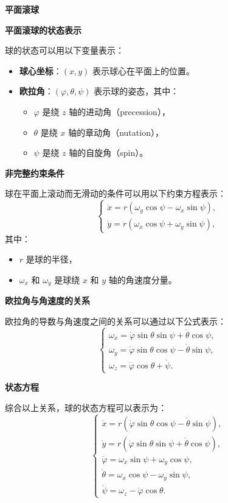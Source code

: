 \documentclass[12pt, a4paper, oneside, UTF8]{ctexbook}  %
\begin{document}
\begin{example}\label{pingmiangunqiu}
    \textbf{平面滚球}

\textbf{平面滚球的状态表示}

球的状态可以用以下变量表示：
\begin{itemize}
    \item \textbf{球心坐标}：$(x, y)$ 表示球心在平面上的位置。
    \item \textbf{欧拉角}：$(\varphi, \theta, \psi)$ 表示球的姿态，其中：
    \begin{itemize}
        \item $\varphi$ 是绕 $z$ 轴的进动角（precession），
        \item $\theta$ 是绕 $x$ 轴的章动角（nutation），
        \item $\psi$ 是绕 $z$ 轴的自旋角（spin）。
    \end{itemize}
\end{itemize}

\textbf{非完整约束条件}

球在平面上滚动而无滑动的条件可以用以下约束方程表示：
\[
\begin{cases}
\dot{x} = r (\omega_y \cos \psi - \omega_x \sin \psi), \\
\dot{y} = r (\omega_x \cos \psi + \omega_y \sin \psi),
\end{cases}
\]
其中：
\begin{itemize}
    \item $r$ 是球的半径，
    \item $\omega_x$ 和 $\omega_y$ 是球绕 $x$ 和 $y$ 轴的角速度分量。
\end{itemize}

\textbf{欧拉角与角速度的关系}

欧拉角的导数与角速度之间的关系可以通过以下公式表示：
\[
\begin{cases}
\omega_x = \dot{\varphi} \sin \theta \sin \psi + \dot{\theta} \cos \psi, \\
\omega_y = \dot{\varphi} \sin \theta \cos \psi - \dot{\theta} \sin \psi, \\
\omega_z = \dot{\varphi} \cos \theta + \dot{\psi}.
\end{cases}
\]

\textbf{状态方程}

综合以上关系，球的状态方程可以表示为：
\[
\begin{cases}
\dot{x} = r (\dot{\varphi} \sin \theta \cos \psi - \dot{\theta} \sin \psi), \\
\dot{y} = r (\dot{\varphi} \sin \theta \sin \psi + \dot{\theta} \cos \psi), \\
\dot{\varphi} = \omega_x \sin \psi + \omega_y \cos \psi, \\
\dot{\theta} = \omega_x \cos \psi - \omega_y \sin \psi, \\
\dot{\psi} = \omega_z - \dot{\varphi} \cos \theta.
\end{cases}
\]
\end{example}
\end{document}
